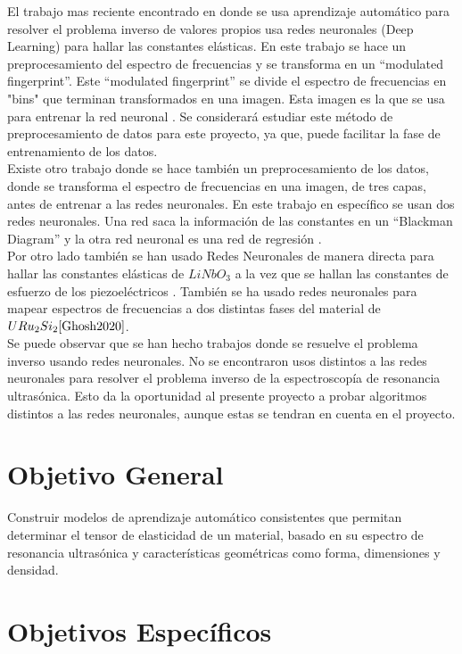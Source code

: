 \documentclass[12pt]{article}
\begin{document}
El trabajo mas reciente encontrado en donde se usa aprendizaje automático para resolver el problema inverso de valores propios usa redes neuronales (Deep Learning) para hallar las constantes elásticas. En este trabajo se hace un preprocesamiento del espectro de frecuencias y se transforma en un ``modulated fingerprint''. Este ``modulated fingerprint'' se divide el espectro de frecuencias en "bins" que terminan transformados en una imagen. Esta imagen es la que se usa para entrenar la red neuronal \cite{Liu2023}. Se considerará estudiar este método de preprocesamiento de datos para este proyecto, ya que, puede facilitar la fase de entrenamiento de los datos.
\\
Existe otro trabajo donde se hace también un preprocesamiento de los datos, donde se transforma el espectro de frecuencias en una imagen, de tres capas, antes de entrenar a las redes neuronales. En este trabajo en específico se usan dos redes neuronales. Una red saca la información de las constantes en un ``Blackman Diagram'' y la otra red neuronal es una red de regresión \cite{Fukuda2023}. 
\\
Por otro lado también se han usado Redes Neuronales de manera directa para hallar las constantes elásticas de $LiNbO_3$ a la vez que se hallan las constantes de esfuerzo de los piezoeléctricos \cite{Yang2022}. También se ha usado redes neuronales para mapear espectros de frecuencias a dos distintas fases del material de $URu_{2}Si_{2} \cite{Ghosh2020}$. 
\\
Se puede observar que se han hecho trabajos donde se resuelve el problema inverso usando redes neuronales. No se encontraron usos distintos a las redes neuronales para resolver el problema inverso de la espectroscopía de resonancia ultrasónica. Esto da la oportunidad al presente proyecto a probar algoritmos distintos a las redes neuronales, aunque estas se tendran en cuenta en el proyecto. 

\section{Objetivo General}

Construir modelos de aprendizaje automático consistentes que permitan determinar el tensor de elasticidad de un material, basado en su espectro de resonancia ultrasónica y características geométricas como forma, dimensiones y densidad.
\section{Objetivos Específicos}
\end{document}
